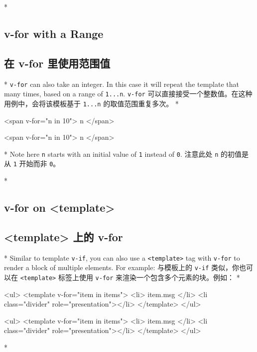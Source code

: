 \begin{paracol}{2}
\switchcolumn[0]*%
\subsection{v-for with a Range}
\switchcolumn
\subsection{在 v-for 里使用范围值}
\switchcolumn[0]*%
\texttt{v-for} can also take an integer. In this case it will repeat the
template that many times, based on a range of \texttt{1...n}.
\switchcolumn
\texttt{v-for} 可以直接接受一个整数值。在这种用例中，会将该模板基于
\texttt{1...n} 的取值范围重复多次。
\switchcolumn[0]*%
\begin{codeHtml}
<span v-for="n in 10">{{ n }}</span>
\end{codeHtml}
\switchcolumn
\begin{codeHtml}
<span v-for="n in 10">{{ n }}</span>
\end{codeHtml}
\switchcolumn[0]*%
Note here \texttt{n} starts with an initial value of \texttt{1} instead
of \texttt{0}.
\switchcolumn
注意此处 \texttt{n} 的初值是从 \texttt{1} 开始而非 \texttt{0}。


\switchcolumn[0]*%
\subsection{v-for on \textless template\textgreater{}}
\switchcolumn
\subsection{\textless template\textgreater{} 上的 v-for}
\switchcolumn[0]*%
Similar to template \texttt{v-if}, you can also use a
\texttt{\textless{}template\textgreater{}} tag with \texttt{v-for} to
render a block of multiple elements. For example:
\switchcolumn
与模板上的 \texttt{v-if} 类似，你也可以在
\texttt{\textless{}template\textgreater{}} 标签上使用 \texttt{v-for}
来渲染一个包含多个元素的块。例如：
\switchcolumn[0]*%
\begin{codeHtml}
<ul>
  <template v-for="item in items">
    <li>{{ item.msg }}</li>
    <li class="divider" role="presentation"></li>
  </template>
</ul>
\end{codeHtml}
\switchcolumn
\begin{codeHtml}
<ul>
  <template v-for="item in items">
    <li>{{ item.msg }}</li>
    <li class="divider" role="presentation"></li>
  </template>
</ul>
\end{codeHtml}
\switchcolumn[0]*%

\end{paracol}
